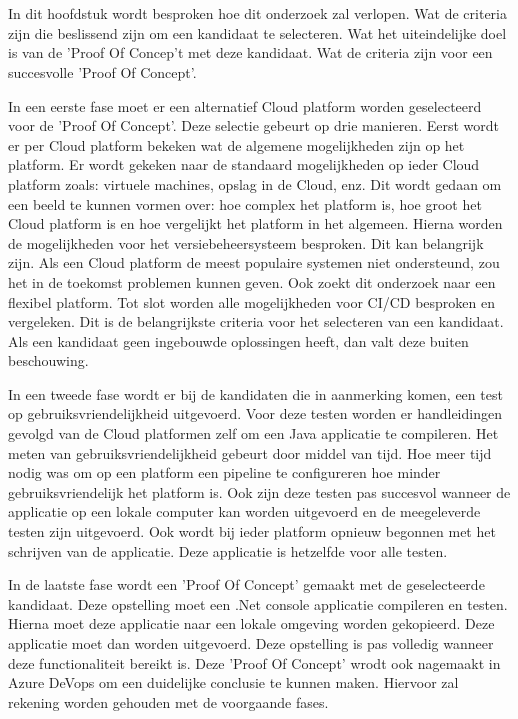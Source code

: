 
\chapter{}
\label{ch:methodologie}
In dit hoofdstuk wordt besproken hoe dit onderzoek zal verlopen. Wat de criteria zijn die beslissend zijn om een kandidaat te selecteren. Wat het uiteindelijke doel is van de 'Proof Of Concep't met deze kandidaat. Wat de criteria zijn voor een succesvolle 'Proof Of Concept'.

In een eerste fase moet er een alternatief Cloud platform worden geselecteerd voor de 'Proof Of Concept'. Deze selectie gebeurt op drie manieren. Eerst wordt er per Cloud platform bekeken wat de algemene mogelijkheden zijn op het platform. Er wordt gekeken naar de standaard mogelijkheden op ieder Cloud platform zoals: virtuele machines, opslag in de Cloud, enz. Dit wordt gedaan om een beeld te kunnen vormen over: hoe complex het platform is, hoe groot het Cloud platform is en hoe vergelijkt het platform in het algemeen. Hierna worden de mogelijkheden voor het versiebeheersysteem besproken. Dit kan belangrijk zijn. Als een Cloud platform de meest populaire systemen niet ondersteund, zou het in de toekomst problemen kunnen geven. Ook zoekt dit onderzoek naar een flexibel platform. Tot slot worden alle mogelijkheden voor CI/CD besproken en vergeleken. Dit is de belangrijkste criteria voor het selecteren van een kandidaat. Als een kandidaat geen ingebouwde oplossingen heeft, dan valt deze buiten beschouwing.

In een tweede fase wordt er bij de kandidaten die in aanmerking komen, een test op gebruiksvriendelijkheid uitgevoerd. Voor deze testen worden er handleidingen gevolgd van de Cloud platformen zelf om een Java applicatie te compileren. Het meten van gebruiksvriendelijkheid gebeurt door middel van tijd. Hoe meer tijd nodig was om op een platform een pipeline te configureren hoe minder gebruiksvriendelijk het platform is. Ook zijn deze testen pas succesvol wanneer de applicatie op een lokale computer kan worden uitgevoerd en de meegeleverde testen zijn uitgevoerd. Ook wordt bij ieder platform opnieuw begonnen met het schrijven van de applicatie. Deze applicatie is hetzelfde voor alle testen.

In de laatste fase wordt een 'Proof Of Concept' gemaakt met de geselecteerde kandidaat. Deze opstelling moet een .Net console applicatie compileren en testen. Hierna moet deze applicatie naar een lokale omgeving worden gekopieerd. Deze applicatie moet dan worden uitgevoerd. Deze opstelling is pas volledig wanneer deze functionaliteit bereikt is. Deze 'Proof Of Concept' wrodt ook nagemaakt in Azure DeVops om een duidelijke conclusie te kunnen maken. Hiervoor zal rekening worden gehouden met de voorgaande fases.

